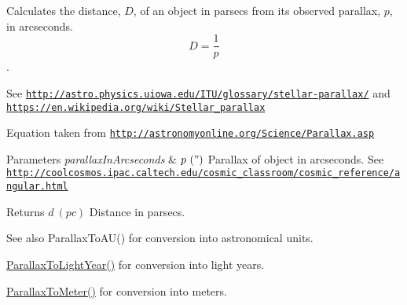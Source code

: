 Calculates the distance, $D$, of an object in parsecs from its observed parallax, $p$, in arcseconds. \[ D=\dfrac{1}{p}\]. 

See \href{http://astro.physics.uiowa.edu/ITU/glossary/stellar-parallax/}{\tt http\+://astro.\+physics.\+uiowa.\+edu/\+I\+T\+U/glossary/stellar-\/parallax/} and \href{https://en.wikipedia.org/wiki/Stellar_parallax}{\tt https\+://en.\+wikipedia.\+org/wiki/\+Stellar\+\_\+parallax}

Equation taken from \href{http://astronomyonline.org/Science/Parallax.asp}{\tt http\+://astronomyonline.\+org/\+Science/\+Parallax.\+asp}


\begin{DoxyParams}{Parameters}
{\em parallax\+In\+Arcseconds} & $ p\ (")$ Parallax of object in arcseconds. See \href{http://coolcosmos.ipac.caltech.edu/cosmic_classroom/cosmic_reference/angular.html}{\tt http\+://coolcosmos.\+ipac.\+caltech.\+edu/cosmic\+\_\+classroom/cosmic\+\_\+reference/angular.\+html} \\
\hline
\end{DoxyParams}
\begin{DoxyReturn}{Returns}
$ d\ (pc)$ Distance in parsecs. 
\end{DoxyReturn}
\begin{DoxySeeAlso}{See also}
Parallax\+To\+A\+U() for conversion into astronomical units. 

\mbox{\hyperlink{group___e_g_x_phys-_astrophysic-_parallax_gacaec31498f264e2a1dc285062a394de2}{Parallax\+To\+Light\+Year()}} for conversion into light years. 

\mbox{\hyperlink{group___e_g_x_phys-_astrophysic-_parallax_ga94912bf8b98a04cccab8ef19eaa89b6a}{Parallax\+To\+Meter()}} for conversion into meters. 
\end{DoxySeeAlso}

